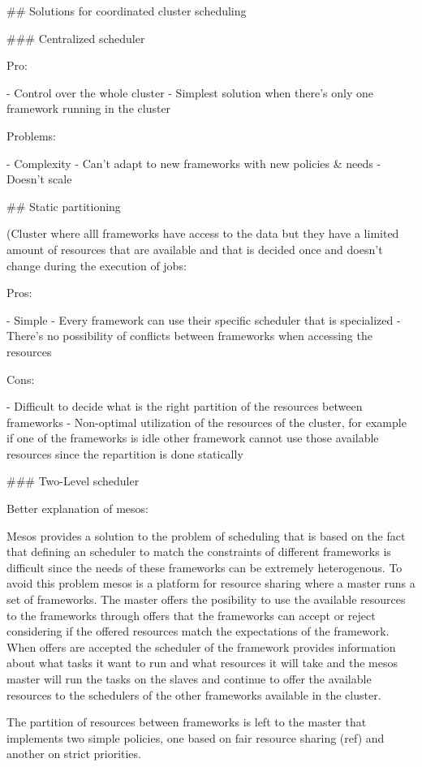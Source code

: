 ## Solutions for coordinated cluster scheduling

### Centralized scheduler

Pro:

- Control over the whole cluster
- Simplest solution when there's only one framework running in the cluster

Problems:

- Complexity
- Can't adapt to new frameworks with new policies & needs
- Doesn't scale

## Static partitioning

(Cluster where alll frameworks have access to the data but they have a
limited amount of resources that are available and that is decided
once and doesn't change during the execution of jobs:

Pros:

- Simple
- Every framework can use their specific scheduler that is specialized
- There's no possibility of conflicts between frameworks when
  accessing the resources

Cons:

- Difficult to decide what is the right partition of the resources
between frameworks
- Non-optimal utilization of the resources of the cluster, for example
if one of the frameworks is idle other framework cannot use those
available resources since the repartition is done statically

### Two-Level scheduler

Better explanation of mesos:

Mesos provides a solution to the problem of scheduling that is based
on the fact that defining an scheduler to match the constraints of different
frameworks is difficult since the needs of these frameworks can be
extremely heterogenous. To avoid this problem mesos is a platform for
resource sharing where a master runs a set of frameworks. The master
offers the posibility to use the available resources to the frameworks
through offers that the frameworks can accept or reject considering if
the offered resources match the expectations of the framework. When
offers are accepted the scheduler of the framework provides
information about what tasks it want to run and what resources it will
take and the mesos master will run the tasks on the slaves and
continue to offer the available resources to the schedulers of the
other frameworks available in the cluster.

The partition of resources between frameworks is left to the master
that implements two simple policies, one based on fair resource
sharing (ref) and another on strict priorities.


